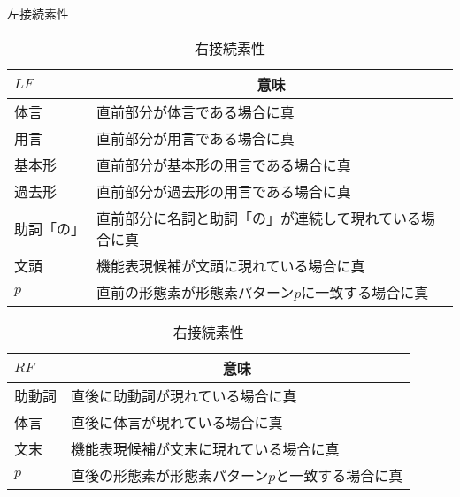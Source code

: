 \documentclass[japanese]{jnlp_1.2d}
\begin{document}
\begin{table}[b]
  \caption{左接続素性}
  \label{tbl:左接続素性}
  \begin{center}
    \begin{tabular}{l|p{}}\hline
      $LF$ & \multicolumn{1}{c}{意味} \\ \hline
      体言 & 直前部分が体言である場合に真 \\ 
      用言 & 直前部分が用言である場合に真 \\ 
      基本形 & 直前部分が基本形の用言である場合に真 \\ 
      過去形 & 直前部分が過去形の用言である場合に真 \\ 
      助詞「の」 & 直前部分に名詞と助詞「の」が連続して現れている場合に真 \\ 
      文頭 & 機能表現候補が文頭に現れている場合に真 \\ 
      $p$ & 直前の形態素が形態素パターン$p$に一致する場合に真 \\ 
      \hline
    \end{tabular}
  \end{center}
  \vspace*{5mm}
  \caption{右接続素性}
  \label{tbl:右接続素性}
  \begin{center}
    \begin{tabular}{l|p{}}\hline
      $RF$ & \multicolumn{1}{c}{意味} \\ \hline
      助動詞 & 直後に助動詞が現れている場合に真 \\
      体言 & 直後に体言が現れている場合に真 \\
      文末 & 機能表現候補が文末に現れている場合に真 \\
      $p$ & 直後の形態素が形態素パターン$p$と一致する場合に真 \\
      \hline
    \end{tabular}
  \end{center}
\end{table}
\end{document}
